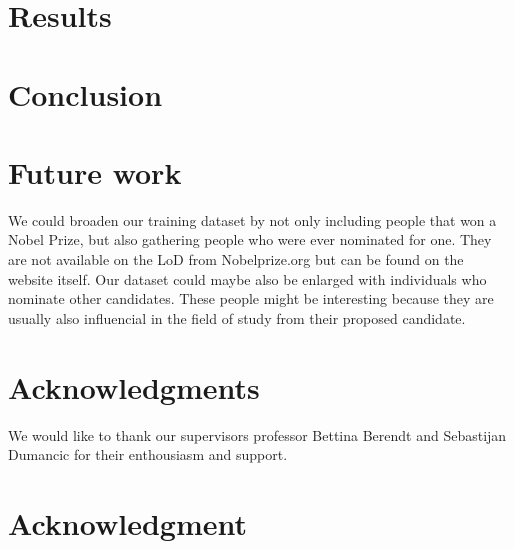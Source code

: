 \documentclass[11pt,journal,compsoc]{IEEEtran}
\begin{document}




\section{Results}
\label{sec:results}

\section{Conclusion}

\section{Future work}

We could broaden our training dataset by not only including people that won a Nobel Prize, but also gathering people who were ever nominated for one. They are not available on the LoD from Nobelprize.org but can be found on the website itself\cite{nominated}.
Our dataset could maybe also be enlarged with individuals who nominate other candidates. These people might be interesting because they are usually also influencial in the field of study from their proposed candidate.



\ifCLASSOPTIONcompsoc
  \section*{Acknowledgments}
  We would like to thank our supervisors professor Bettina Berendt and Sebastijan Dumancic for their enthousiasm and support.
\else
  \section*{Acknowledgment}
\fi

\end{document}
